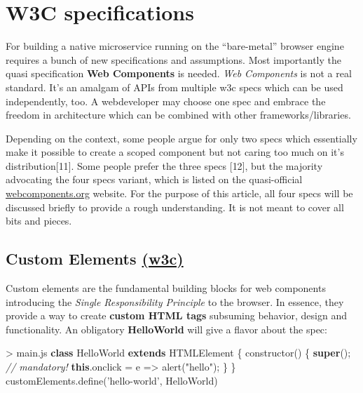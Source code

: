 \documentclass[]{article}
\newenvironment{Shaded}{}{}
\newcommand{\KeywordTok}[1]{\textcolor[rgb]{0.00,0.44,0.13}{\textbf{{#1}}}}
\newcommand{\StringTok}[1]{\textcolor[rgb]{0.25,0.44,0.63}{{#1}}}
\newcommand{\CommentTok}[1]{\textcolor[rgb]{0.38,0.63,0.69}{\textit{{#1}}}}
\newcommand{\VariableTok}[1]{\textcolor[rgb]{0.10,0.09,0.49}{{#1}}}
\newcommand{\OperatorTok}[1]{\textcolor[rgb]{0.40,0.40,0.40}{{#1}}}
\newcommand{\AttributeTok}[1]{\textcolor[rgb]{0.49,0.56,0.16}{{#1}}}
\newcommand{\NormalTok}[1]{{#1}}
\begin{document}
\section{W3C specifications}\label{w3c-specifications}

For building a native microservice running on the ``bare-metal'' browser
engine requires a bunch of new specifications and assumptions. Most
importantly the quasi specification \textbf{Web Components} is needed.
\emph{Web Components} is not a real standard. It's an amalgam of APIs
from multiple w3c specs which can be used independently, too. A
webdeveloper may choose one spec and embrace the freedom in architecture
which can be combined with other frameworks/libraries.

Depending on the context, some people argue for only two specs which
essentially make it possible to create a scoped component but not caring
too much on it's distribution{[}11{]}. Some people prefer the three
specs {[}12{]}, but the majority advocating the four specs variant,
which is listed on the quasi-official
\href{http://webcomponents.org}{webcomponents.org} website. For the
purpose of this article, all four specs will be discussed briefly to
provide a rough understanding. It is not meant to cover all bits and
pieces.

\subsection{\texorpdfstring{Custom Elements
\href{http://w3c.github.io/webcomponents/spec/custom/}{(w3c)}}{Custom Elements (w3c)}}\label{custom-elements-w3c}

Custom elements are the fundamental building blocks for web components
introducing the \emph{Single Responsibility Principle} to the browser.
In essence, they provide a way to create \textbf{custom HTML tags}
subsuming behavior, design and functionality. An obligatory
\textbf{HelloWorld} will give a flavor about the spec:

\begin{Shaded}
\begin{Highlighting}[]
\OperatorTok{>} \VariableTok{main}\NormalTok{.}\AttributeTok{js}
\KeywordTok{class} \NormalTok{HelloWorld }\KeywordTok{extends} \NormalTok{HTMLElement }\OperatorTok{\{}
 \AttributeTok{constructor}\NormalTok{() }\OperatorTok{\{}
  \KeywordTok{super}\NormalTok{()}\OperatorTok{;} \CommentTok{// mandatory!}
  \KeywordTok{this}\NormalTok{.}\AttributeTok{onclick} \OperatorTok{=} \NormalTok{e }\OperatorTok{=>} \AttributeTok{alert}\NormalTok{(}\StringTok{"hello"}\NormalTok{)}\OperatorTok{;}
 \OperatorTok{\}}
\OperatorTok{\}}
\VariableTok{customElements}\NormalTok{.}\AttributeTok{define}\NormalTok{(}\StringTok{'hello-world'}\OperatorTok{,} \NormalTok{HelloWorld)}
\end{Highlighting}
\end{Shaded}
\end{document}
